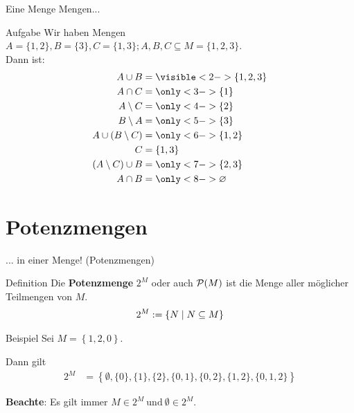 \begin{frame}{Eine Menge Mengen...}
	\begin{block}{Aufgabe}
		Wir haben Mengen $A = \{1, 2\}, B = \{3\}, C = \{1, 3\}; A,B,C \subseteq M = \{1, 2, 3\}$.\\
		Dann ist:
		\begin{align*}
		A \cup B &= \visible<2->{ \{1, 2, 3\} }  \\
		A \cap C &= \only<3->{ \{1\} }\\
		A \setminus C &= \only<4->{ \{2\} }\\
		B \setminus A &= \only<5->{ \{3\} }\\
		A \cup (B \setminus C) &= \only<6->{ \{1, 2\} }\\
		C &= \{1, 3\} \\
		(A \setminus C) \cup B &= \only<7->{ \{2, 3\} }\\
		A \cap B &= \only<8->{ \emptyset }
		\end{align*}
	\end{block}
\end{frame}



\section{Potenzmengen}

\begin{frame}{... in einer Menge! (Potenzmengen)}
	\begin{block}{Definition}
		Die \textbf{Potenzmenge} $2^M$ oder auch $\mathcal{P} (M)$ ist die Menge aller möglicher Teilmengen von $M$. 
		\begin{align*}
			2^M := \left\{ N \;\middle|\;  N \subseteq M \right\}
		\end{align*}
	\end{block}
	\pause
	
	\begin{exampleblock}{Beispiel}
		Sei $M = \left\{ 1,2,0 \right\} $. \\ \pause
		
		Dann gilt  
		\begin{align*}   
		2^M &= \left\{ \emptyset, \{ 0 \}, \{ 1 \}, \{ 2 \}, \{ 0,1 \} , \{ 0,2 \}, \{ 1,2 \}, \{ 0,1,2 \} \right\}
		\end{align*}
		
		\textbf{Beachte}: Es gilt immer $M \in 2^M \ \text{und} \ \emptyset \in 2^M$.
	\end{exampleblock}
	
\end{frame}

